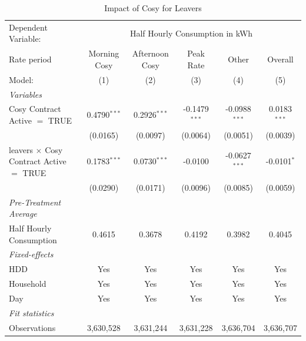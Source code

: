 
\begin{table}[htbp]
   \caption{\label{tab:did-leavers} Impact of Cosy for Leavers}
   \centering
   \begin{tabular}{lccccc}
      \tabularnewline \midrule \midrule
      Dependent Variable: & \multicolumn{5}{c}{Half Hourly Consumption in kWh}\\
      Rate period                                     & Morning Cosy   & Afternoon Cosy & Peak Rate       & Other           & Overall \\   
      Model:                                          & (1)            & (2)            & (3)             & (4)             & (5)\\  
      \midrule
      \emph{Variables}\\
      Cosy Contract Active $=$ TRUE                   & 0.4790$^{***}$ & 0.2926$^{***}$ & -0.1479$^{***}$ & -0.0988$^{***}$ & 0.0183$^{***}$\\   
                                                      & (0.0165)       & (0.0097)       & (0.0064)        & (0.0051)        & (0.0039)\\   
      leavers $\times$ Cosy Contract Active $=$ TRUE  & 0.1783$^{***}$ & 0.0730$^{***}$ & -0.0100         & -0.0627$^{***}$ & -0.0101$^{*}$\\   
                                                      & (0.0290)       & (0.0171)       & (0.0096)        & (0.0085)        & (0.0059)\\   
\midrule
\emph{Pre-Treatment Average}\\
      Half Hourly Consumption                         & 0.4615         & 0.3678         & 0.4192          & 0.3982          & 0.4045\\  
      \midrule
      \emph{Fixed-effects}\\
      HDD                                             & Yes            & Yes            & Yes             & Yes             & Yes\\  
      Household                                       & Yes            & Yes            & Yes             & Yes             & Yes\\  
      Day                                             & Yes            & Yes            & Yes             & Yes             & Yes\\  
      \midrule
      \emph{Fit statistics}\\
      Observations                                    & 3,630,528      & 3,631,244      & 3,631,228       & 3,636,704       & 3,636,707\\  

\end{tabular}
\end{table}
